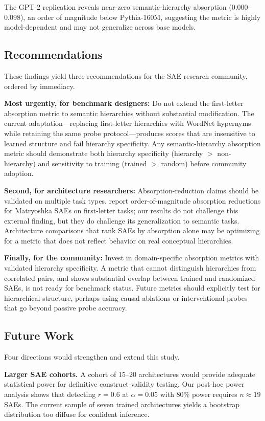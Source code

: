 \documentclass{article}
\begin{document}
The GPT-2 replication reveals near-zero semantic-hierarchy absorption (0.000--0.098), an order of magnitude below Pythia-160M, suggesting the metric is highly model-dependent and may not generalize across base models.

\subsection{Recommendations}

These findings yield three recommendations for the SAE research community, ordered by immediacy.

\textbf{Most urgently, for benchmark designers:} Do not extend the first-letter absorption metric to semantic hierarchies without substantial modification. The current adaptation---replacing first-letter hierarchies with WordNet hypernyms while retaining the same probe protocol---produces scores that are insensitive to learned structure and fail hierarchy specificity. Any semantic-hierarchy absorption metric should demonstrate both hierarchy specificity (hierarchy $>$ non-hierarchy) and sensitivity to training (trained $>$ random) before community adoption.

\textbf{Second, for architecture researchers:} Absorption-reduction claims should be validated on multiple task types. \citet{bussmann2025matryoshka} report order-of-magnitude absorption reductions for Matryoshka SAEs on first-letter tasks; our results do not challenge this external finding, but they do challenge its generalization to semantic tasks. Architecture comparisons that rank SAEs by absorption alone may be optimizing for a metric that does not reflect behavior on real conceptual hierarchies.

\textbf{Finally, for the community:} Invest in domain-specific absorption metrics with validated hierarchy specificity. A metric that cannot distinguish hierarchies from correlated pairs, and shows substantial overlap between trained and randomized SAEs, is not ready for benchmark status. Future metrics should explicitly test for hierarchical structure, perhaps using causal ablations or interventional probes that go beyond passive probe accuracy.

\subsection{Future Work}

Four directions would strengthen and extend this study.

\textbf{Larger SAE cohorts.} A cohort of 15--20 architectures would provide adequate statistical power for definitive construct-validity testing. Our post-hoc power analysis shows that detecting $r = 0.6$ at $\alpha = 0.05$ with 80\% power requires $n \approx 19$ SAEs. The current sample of seven trained architectures yields a bootstrap distribution too diffuse for confident inference.
\end{document}
